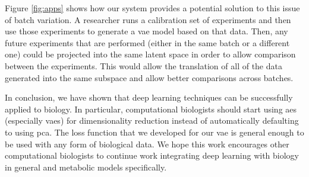 Figure \ref{fig:apps} shows how our system provides a potential solution to this issue of batch variation.
A researcher runs a calibration set of experiments and then use those experiments to generate a \gls{vae} model based on that data.
Then, any future experiments that are performed (either in the same batch or a different one) could be projected into the same latent space in order to allow comparison between the experiments.
This would allow the translation of all of the data generated into the same subspace and allow better comparisons across batches.

In conclusion, we have shown that deep learning techniques can be successfully applied to biology.
In particular, computational biologists should start using \glspl{ae} (especially \glspl{vae}) for dimensionality reduction instead of automatically defaulting to using \gls{pca}.
The loss function that we developed for our \gls{vae} is general enough to be used with any form of biological data.
We hope this work encourages other computational biologists to continue work integrating deep learning with biology in general and metabolic models specifically.